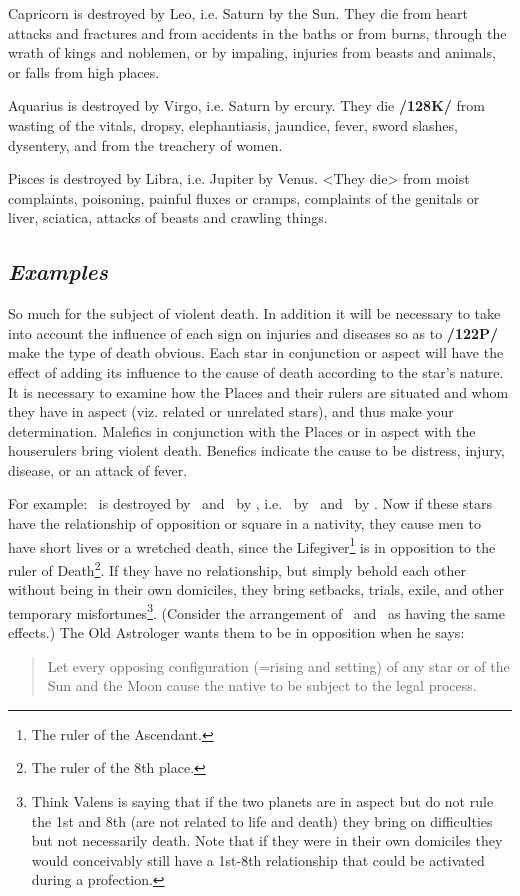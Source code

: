 Capricorn \mn{\Capricorn} is destroyed by Leo, i.e. Saturn by the Sun. They die from heart attacks and fractures and from accidents in the baths or from burns, through the wrath of kings and noblemen, or by impaling, injuries from beasts and animals, or falls from high places.

Aquarius \mn{\Aquarius} is destroyed by Virgo, i.e. Saturn by ercury. They die \textbf{/128K/} from wasting of the vitals, dropsy, elephantiasis, jaundice, fever, sword slashes, dysentery, and from the treachery of women.

Pisces \mn{\Pisces} is destroyed by Libra, i.e. Jupiter by Venus. <They die> from moist complaints, poisoning, painful fluxes or cramps, complaints of the genitals or liver, sciatica, attacks of beasts and crawling things.

\subsection{\textit{Examples}}
So much for the subject of violent death. In addition it will be necessary to take into account the influence of each sign on injuries and diseases so as to \textbf{/122P/} make the type of death obvious. Each star in conjunction or aspect will have the effect of adding its influence to the cause of death according to the star’s nature. It is necessary to examine how the Places and their rulers are situated and whom they have in
aspect (viz. related or unrelated stars), and thus make your determination. Malefics in conjunction with the Places or in aspect with the houserulers bring violent death. Benefics indicate the cause to be distress, injury, disease, or an attack of fever. 

For example: \Gemini\, is destroyed by \Capricorn\, and \Aquarius\, by \Virgo, i.e. \Mercury\, by \Saturn\, and \Saturn\, by \Mercury. Now if these stars have the relationship of opposition or square in a nativity, they cause men to have short lives or a wretched death, since the Lifegiver\footnote{The ruler of the Ascendant.} is in opposition to the ruler of Death\footnote{The ruler of the 8th place.}. If they have no relationship, but simply  behold each other without being in their own domiciles, they bring setbacks, trials, exile, and other temporary misfortunes\footnote{Think Valens is saying that if the two planets are in aspect but do not rule the 1st and 8th (are not related to life and death) they bring on difficulties but not necessarily death.  Note that if they were in their own domiciles they would conceivably still have a 1st-8th relationship that could be activated during a profection.}. (Consider the arrangement of \Mars\, and \Mercury\, as having the same effects.) The Old Astrologer wants them to be in opposition when he says: \begin{quote}Let every opposing configuration (=rising and setting) of any star or of the Sun and the Moon cause the native to be subject to the legal process.\end{quote}

